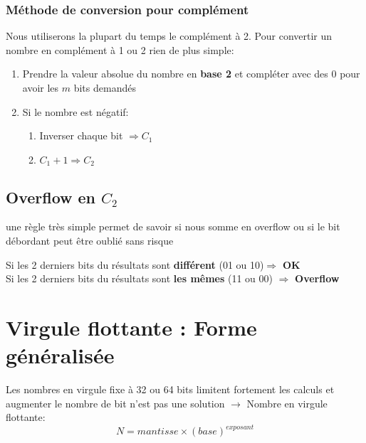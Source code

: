\subsubsection{Méthode de conversion pour complément}
Nous utiliserons la plupart du temps le complément à 2. Pour convertir un nombre en complément à 1 ou 2 rien de plus simple: 
\begin{enumerate}
	\item Prendre la valeur absolue du nombre en \textbf{base 2} et compléter avec des 0 pour avoir les $m$ bits demandés
	\item Si le nombre est négatif: 
	\begin{enumerate}
		\item Inverser chaque bit $\Rightarrow C_1$
		\item $C_1+1\Rightarrow C_2$
	\end{enumerate}
\end{enumerate}
\subsection{Overflow en $C_2$}
une règle très simple permet de savoir si nous somme en overflow ou si le bit débordant peut être oublié sans risque
\begin{center}
	Si les 2 derniers bits du résultats sont \textbf{différent} (01 ou 10)$\Rightarrow$ \textbf{OK}\\
	Si les 2 derniers bits du résultats sont \textbf{les mêmes} (11 ou 00) $\Rightarrow$ \textbf{Overflow}
\end{center}
\section{Virgule flottante : Forme généralisée}
Les nombres en virgule fixe à 32 ou 64 bits limitent fortement les calculs et augmenter le nombre de bit n'est pas une solution $\rightarrow$ Nombre en virgule flottante:
\begin{equation}
N=mantisse\times(base)^{exposant}
\end{equation}
